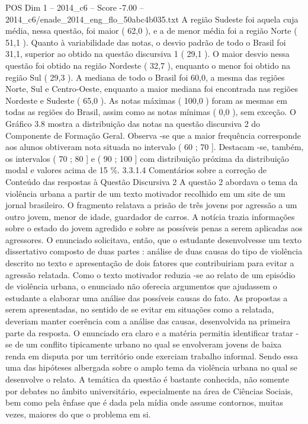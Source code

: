 \begin{textsample}{POS Dim 1 – 2014\_c6 – Score -7.00 – 2014\_c6/enade\_2014\_eng\_flo\_50abc4b035.txt}
A região Sudeste foi aquela cuja média, nessa questão, foi maior ( 62,0 ), e a de menor média foi a região Norte ( 51,1 ).
Quanto à variabilidade das notas, o desvio padrão de todo o Brasil foi 31,1, superior ao obtido na questão discursiva 1 ( 29,1 ).
O maior desvio nessa questão foi obtido na região Nordeste ( 32,7 ), enquanto o menor foi obtido na região Sul ( 29,3 ).
A mediana de todo o Brasil foi 60,0, a mesma das regiões Norte, Sul e Centro-Oeste, enquanto a maior mediana foi encontrada nas regiões Nordeste e Sudeste ( 65,0 ).
As notas máximas ( 100,0 ) foram as mesmas em todas as regiões do Brasil, assim como as notas mínimas ( 0,0 ), sem exceção.
O Gráfico 3.8 mostra a distribuição das notas na questão discursiva 2 do Componente de Formação Geral.
Observa -se que a maior frequência corresponde aos alunos obtiveram nota situada no intervalo ( 60 ; 70 ].
Destacam -se, também, os intervalos ( 70 ; 80 ] e ( 90 ; 100 ] com distribuição próxima da distribuição modal e valores acima de 15 \%. 3.3.1.4 Comentários sobre a correção de Conteúdo das respostas à Questão Discursiva 2 A questão 2 abordava o tema da violência urbana a partir de um texto motivador recolhido em um site de um jornal brasileiro.
O fragmento relatava a prisão de três jovens por agressão a um outro jovem, menor de idade, guardador de carros.
A notícia trazia informações sobre o estado do jovem agredido e sobre as possíveis penas a serem aplicadas aos agressores.
O enunciado solicitava, então, que o estudante desenvolvesse um texto dissertativo composto de duas partes : análise de duas causas do tipo de violência descrito no texto e apresentação de dois fatores que contribuiriam para evitar a agressão relatada.
Como o texto motivador reduzia -se ao relato de um episódio de violência urbana, o enunciado não oferecia argumentos que ajudassem o estudante a elaborar uma análise das possíveis causas do fato.
As propostas a serem apresentadas, no sentido de se evitar em situações como a relatada, deveriam manter coerência com a análise das causas, desenvolvida na primeira parte da resposta.
O enunciado era claro e a matéria permitia identificar tratar -se de um conflito tipicamente urbano no qual se envolveram jovens de baixa renda em disputa por um território onde exerciam trabalho informal.
Sendo essa uma das hipóteses albergada sobre o amplo tema da violência urbana no qual se desenvolve o relato.
A temática da questão é bastante conhecida, não somente por debates no âmbito universitário, especialmente na área de Ciências Sociais, bem como pela ênfase que é dada pela mídia onde assume contornos, muitas vezes, maiores do que o problema em si.

\end{textsample}
